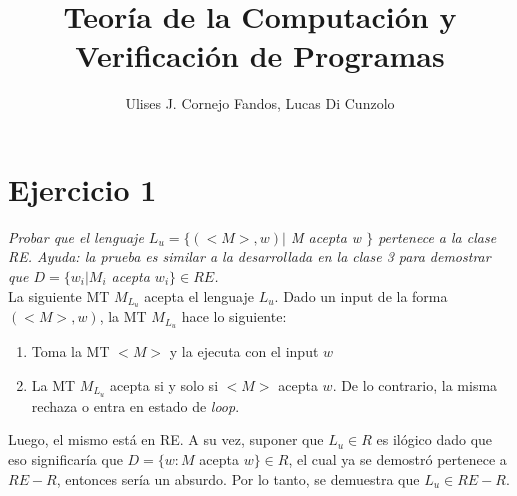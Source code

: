 \documentclass[lnbip]{svmultln}
\begin{document}
%
\mainmatter              %
%
\title{Teoría de la Computación y Verificación de Programas}
%
%
\author{Ulises J. Cornejo Fandos, Lucas Di Cunzolo}
%
%

%

\maketitle              %
%

\section{Ejercicio 1}

\textit{Probar que el lenguaje $L_u = \{(<M>,w) |$ M acepta w $\}$ pertenece a la clase RE. Ayuda: la prueba es similar a la desarrollada en la clase 3 para demostrar que $D = \{ w_i | M_i$ acepta $w_i \} \in RE$.} \\

La siguiente MT $M_{L_u}$ acepta el lenguaje $L_u$. Dado un input de la forma $(<M>, w)$, la MT $M_{L_u}$ hace lo siguiente:

\begin{enumerate}
    \item Toma la MT $<M>$ y la ejecuta con el input $w$
    \item La MT $M_{L_u}$ acepta si y solo si $<M>$ acepta $w$. De lo contrario, la misma rechaza o entra en estado de \textit{loop}.
\end{enumerate}

Luego, el mismo está en RE. A su vez, suponer que $L_u \in R$ es ilógico dado que eso significaría que $D = \{ w : M$ acepta $w \} \in R$, el cual ya se demostró pertenece a $RE - R$, entonces sería un absurdo. Por lo tanto, se demuestra que $L_u \in RE - R$.
\end{document}
